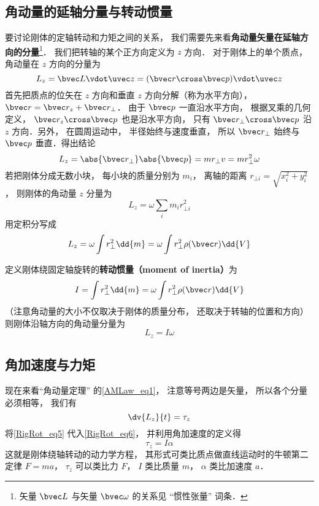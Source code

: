 \subsection{角动量的延轴分量与转动惯量}
要讨论刚体的定轴转动和力矩之间的关系， 我们需要先来看\textbf{角动量矢量在延轴方向的分量}\footnote{矢量 $\bvec L$ 与矢量 $\bvec \omega$ 的关系见 “惯性张量” 词条．}． 我们把转轴的某个正方向定义为 $z$ 方向． 对于刚体上的单个质点， 角动量在 $z$ 方向的分量为
\begin{equation}
L_z = \bvec L \vdot \uvec z = (\bvec r \cross \bvec p) \vdot \uvec z
\end{equation}
首先把质点的位矢在 $z$ 方向和垂直 $z$ 方向分解（称为水平方向）， $\bvec r = \bvec r_z + \bvec r_ \bot$． 由于 $\bvec p$ 一直沿水平方向， 根据叉乘的几何定义， $\bvec r_z \cross \bvec p$ 也是沿水平方向， 只有 $\bvec r_ \bot \cross \bvec p$ 沿 $z$ 方向．另外， 在圆周运动中， 半径始终与速度垂直， 所以 $\bvec r_ \bot$ 始终与 $\bvec p$ 垂直．得出结论
\begin{equation}
L_z = \abs{\bvec r_\bot} \abs{\bvec p} = m r_ \bot v = mr_ \bot ^2\omega 
\end{equation}
若把刚体分成无数小块， 每小块的质量分别为 $m_i$， 离轴的距离 $r_{\bot i} = \sqrt{x_i^2 + y_i^2} $， 则刚体的角动量 $z$ 分量为
\begin{equation}
L_z = \omega \sum_i m_i r_{ \bot i}^2
\end{equation}
用定积分写成
\begin{equation}
L_z = \omega \int r_ \bot ^2 \dd{m} = \omega \int r_ \bot ^2\rho(\bvec r)  \dd{V} 
\end{equation}

定义刚体绕固定轴旋转的\textbf{转动惯量（moment of inertia）}为
\begin{equation}
I = \int r_ \bot ^2 \dd{m} = \omega \int r_ \bot ^2\rho(\bvec r) \dd{V} 
\end{equation}
（注意角动量的大小不仅取决于刚体的质量分布， 还取决于转轴的位置和方向）则刚体沿轴方向的角动量分量为
\begin{equation}\label{RigRot_eq5}
L_z = I \omega 
\end{equation}

\subsection{角加速度与力矩}
现在来看“角动量定理” 的\autoref{AMLaw_eq1}， 注意等号两边是矢量， 所以各个分量必须相等， 我们有
\begin{equation}\label{RigRot_eq6}
\dv{L_z}{t} = \tau_z
\end{equation}
将\autoref{RigRot_eq5} 代入\autoref{RigRot_eq6}， 并利用角加速度的定义得
\begin{equation}\label{RigRot_eq7}
\tau_z = I\alpha
\end{equation}
这就是刚体绕轴转动的动力学方程， 其形式可类比质点做直线运动时的牛顿第二定律 $F = ma$， $\tau_z$ 可以类比力 $F$， $I$ 类比质量 $m$， $\alpha$ 类比加速度 $a$．


